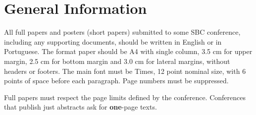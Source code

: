     \section{General Information}

    All full papers and posters (short papers) submitted to some SBC conference,
    including any supporting documents, should be written in English or in
    Portuguese. The format paper should be A4 with single column, 3.5 cm for upper
    margin, 2.5 cm for bottom margin and 3.0 cm for lateral margins, without
    headers or footers. The main font must be Times, 12 point nominal size, with 6
    points of space before each paragraph. Page numbers must be suppressed.

    Full papers must respect the page limits defined by the conference.
    Conferences that publish just abstracts ask for \textbf{one}-page texts.
